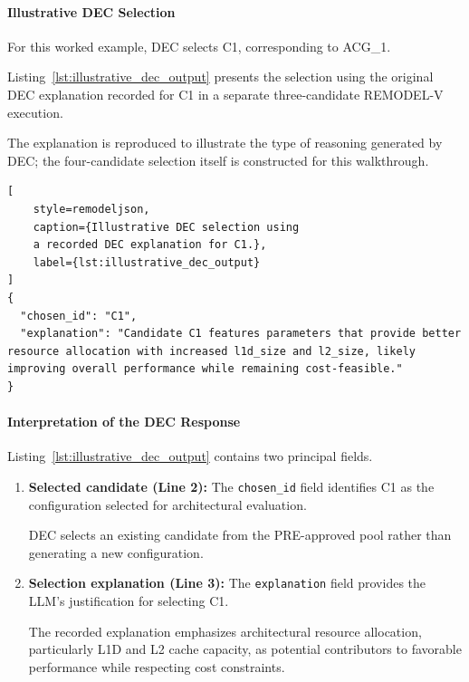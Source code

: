 \paragraph{Illustrative DEC Selection}

For this worked example, DEC selects C1,
corresponding to ACG\_1.

Listing~\ref{lst:illustrative_dec_output}
presents the selection using the original
DEC explanation recorded for C1 in a
separate three-candidate REMODEL-V execution.

The explanation is reproduced to illustrate
the type of reasoning generated by DEC;
the four-candidate selection itself is
constructed for this walkthrough.

\begin{lstlisting}[
    style=remodeljson,
    caption={Illustrative DEC selection using
    a recorded DEC explanation for C1.},
    label={lst:illustrative_dec_output}
]
{
  "chosen_id": "C1",
  "explanation": "Candidate C1 features parameters that provide better resource allocation with increased l1d_size and l2_size, likely improving overall performance while remaining cost-feasible."
}
\end{lstlisting}

\paragraph{Interpretation of the DEC Response}

Listing~\ref{lst:illustrative_dec_output}
contains two principal fields.

\begin{enumerate}

\item \textbf{Selected candidate (Line 2):}
The \texttt{chosen\_id} field identifies
C1 as the configuration selected for
architectural evaluation.

DEC selects an existing candidate from
the PRE-approved pool rather than
generating a new configuration.

\item \textbf{Selection explanation (Line 3):}
The \texttt{explanation} field provides
the LLM's justification for selecting C1.

The recorded explanation emphasizes
architectural resource allocation,
particularly L1D and L2 cache capacity,
as potential contributors to favorable
performance while respecting cost
constraints.

\end{enumerate}

